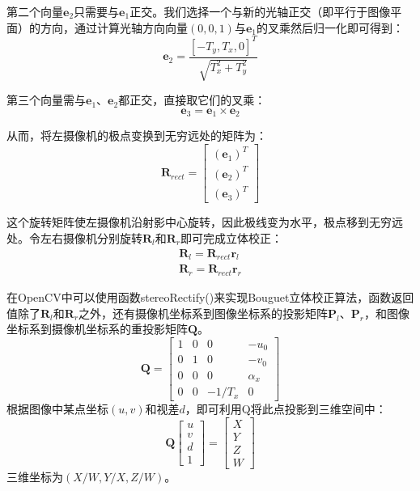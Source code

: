 第二个向量$\mathbf{e}_2$只需要与$\mathbf{e}_1$正交。我们选择一个与新的光轴正交（即平行于图像平面）的方向，通过计算光轴方向向量$(0, 0, 1)$与$\mathbf{e}_1$的叉乘然后归一化即可得到：
%
\begin{equation}\label{eq:2_3_8}
\mathbf{e}_2 = \frac{[-T_y, T_x, 0]^T}{\sqrt{T_x^2 + T_y^2}}
\end{equation}

第三个向量需与$\mathbf{e}_1$、$\mathbf{e}_2$都正交，直接取它们的叉乘：
%
\begin{equation}\label{eq:2_3_9}
\mathbf{e}_3 = \mathbf{e}_1 \times \mathbf{e}_2
\end{equation}

从而，将左摄像机的极点变换到无穷远处的矩阵为：
%
\begin{equation}\label{eq:2_3_10}
\mathbf{R}_{rect} =
\begin{bmatrix}
(\mathbf{e}_1)^T \\ (\mathbf{e}_2)^T \\ (\mathbf{e}_3)^T
\end{bmatrix}
\end{equation}

这个旋转矩阵使左摄像机沿射影中心旋转，因此极线变为水平，极点移到无穷远处。令左右摄像机分别旋转$\mathbf{R}_l$和$\mathbf{R}_r$即可完成立体校正：
%
\begin{gather}\label{eq:2_3_11}
\mathbf{R}_l = \mathbf{R}_{rect}\mathbf{r}_l \\
\mathbf{R}_r = \mathbf{R}_{rect}\mathbf{r}_r
\end{gather}

在OpenCV中可以使用函数stereoRectify()来实现Bouguet立体校正算法，函数返回值除了$\mathbf{R}_l$和$\mathbf{R}_r$之外，还有摄像机坐标系到图像坐标系的投影矩阵$\mathbf{P}_l$、$\mathbf{P}_r$，和图像坐标系到摄像机坐标系的重投影矩阵$\mathbf{Q}$。
%
\begin{equation}\label{eq:2_3_12}
\mathbf{Q} =
\begin{bmatrix}
1 & 0 & 0 & -u_0 \\
0 & 1 & 0 & -v_0 \\
0 & 0 & 0 & \alpha_x \\
0 & 0 & -1/T_x & 0
\end{bmatrix}
\end{equation}
根据图像中某点坐标$(u, v)$和视差$d$，即可利用Q将此点投影到三维空间中：
%
\begin{equation}\label{eq:2_3_13}
\mathbf{Q}
\begin{bmatrix}
u \\ v \\ d \\ 1
\end{bmatrix}
=
\begin{bmatrix}
X \\ Y \\ Z \\ W
\end{bmatrix}
\end{equation}
三维坐标为$(X/W, Y/X, Z/W)$。

